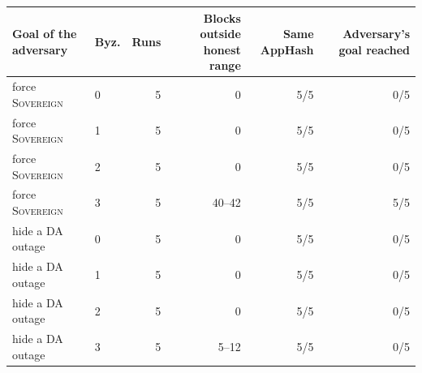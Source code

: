 \begin{tabular}{@{}llrrrr@{}}
\toprule
\textbf{Goal of the adversary} & \textbf{Byz.} & \textbf{Runs} & \textbf{Blocks outside honest range} & \textbf{Same AppHash} & \textbf{Adversary's goal reached} \\
\midrule
force \textsc{Sovereign} & 0 & 5 & 0 & 5/5 & 0/5 \\
force \textsc{Sovereign} & 1 & 5 & 0 & 5/5 & 0/5 \\
force \textsc{Sovereign} & 2 & 5 & 0 & 5/5 & 0/5 \\
force \textsc{Sovereign} & 3 & 5 & 40--42 & 5/5 & 5/5 \\
hide a DA outage & 0 & 5 & 0 & 5/5 & 0/5 \\
hide a DA outage & 1 & 5 & 0 & 5/5 & 0/5 \\
hide a DA outage & 2 & 5 & 0 & 5/5 & 0/5 \\
hide a DA outage & 3 & 5 & 5--12 & 5/5 & 0/5 \\
\bottomrule
\end{tabular}
